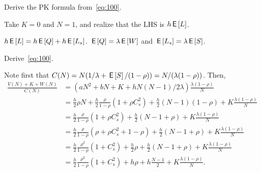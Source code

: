 \begin{exercise}\label{ex:69}
Derive the PK formula from~\cref{eq:100}.
\begin{hint}
Take  $K=0$ and $N=1$, and realize that the LHS is $h\,\mathsf{E}\left[L\right]$. 
\end{hint}
\begin{solution}
$h\,\mathsf{E}\left[L\right] = h \,\mathsf{E}\left[Q\right] + h \,\mathsf{E}\left[L_s\right]$. $\,\mathsf{E}\left[Q\right] = \lambda \,\mathsf{E}\left[W\right]$ and $\,\mathsf{E}\left[L_s\right] = \lambda \,\mathsf{E}\left[S\right]$. 
\end{solution}
\end{exercise}


\begin{exercise}\label{ex:n-mg3}
Derive~\cref{eq:100}.
\begin{solution}
  Note first that $C(N) = N(1/\lambda + \,\mathsf{E}\left[S\right] / (1-\rho)) = N/(\lambda(1-\rho))$. Then,
  \begin{align*}
    \frac{V(N) + K + W(N)}{C(N)}
    &= \left(aN^2 + bN + K + h N(N-1)/2 \lambda\right) \frac{\lambda(1-\rho)}N \\
    &= \frac h 2 \rho N  + \frac h 2 \frac \rho{1-\rho} (1+\rho C_s^2) + \frac h 2 (N-1)(1-\rho) + K \frac{\lambda(1-\rho)}N \\
    &= \frac h 2 \frac \rho{1-\rho} (1+\rho C_s^2) + \frac h 2 (N-1 + \rho) + K \frac{\lambda(1-\rho)}N \\
    &= \frac h 2 \frac \rho{1-\rho} (\rho + \rho C_s^2 + 1 - \rho) + \frac h 2 (N-1 + \rho) + K \frac{\lambda(1-\rho)}N \\
    &= \frac h 2 \frac{\rho^2}{1-\rho} (1+ C_s^2) +\frac h 2 \rho + \frac h 2 (N-1 + \rho) + K \frac{\lambda(1-\rho)}N \\
    &= \frac h 2 \frac{\rho^2}{1-\rho} (1+ C_s^2) + h \rho + h \frac{N-1}2 + K \frac{\lambda(1-\rho)}N.
  \end{align*}
\end{solution}
\end{exercise}



